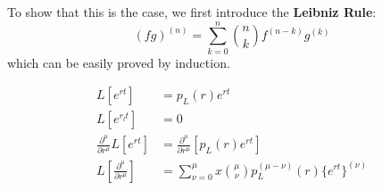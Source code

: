 \documentclass[12pt]{article}
\begin{document}
To show that this is the case, we first introduce the \textbf{Leibniz Rule}:
\[ (fg)^{(n)} = \sum_{k=0}^n \binom{n}{k}f^{(n-k)}g^{(k)} \]
which can be easily proved by induction.

\[
\begin{aligned}
  L[e^{rt}] &= p_L(r)e^{rt}  \\
  L[e^{r_lt}] &= 0 \\
  \frac{\partial^{\mu}}{\partial r^{\mu}} L[e^{rt}] &= \frac{\partial^{\mu}}{\partial r^{\mu}} [p_L(r)e^{rt}] \\
  L\left[\frac{\partial^{\mu}}{\partial r^{\mu}}\right] &= \sum_{\nu = 0}^{\mu}x \binom{\mu}{\nu}p_L^{(\mu - \nu)}(r)\{e^{rt}\}^{(\nu)} 
\end{aligned}
\]
\end{document}
